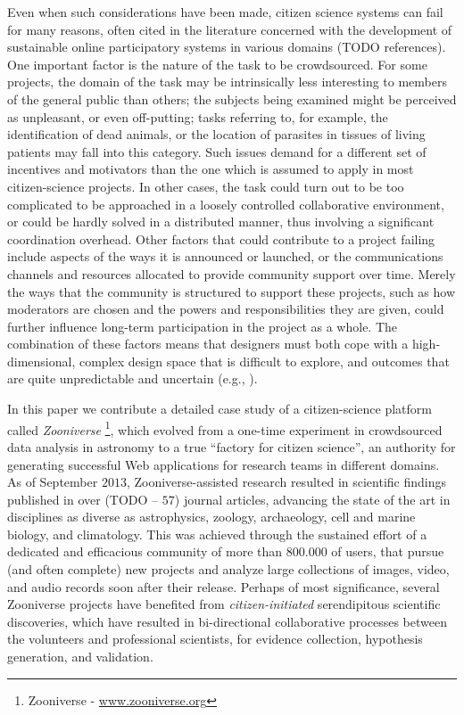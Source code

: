 Even when such considerations have been made, citizen science systems can fail for many reasons, often cited in the literature concerned with the development of sustainable online participatory systems in various domains (TODO references). One important factor is the nature of the task to be crowdsourced. For some projects, the domain of the task may be intrinsically less interesting to members of the general public than others; the subjects being examined might be perceived as unpleasant, or even off-putting; tasks referring to, for example, the identification of dead animals, or the location of parasites in tissues of living patients may fall into this category. Such issues demand for a different set of incentives and motivators than the one which is assumed to apply in most citizen-science projects. In other cases, the task could turn out to be too complicated to be approached in a loosely controlled collaborative environment, or could be hardly solved in a distributed manner, thus involving a significant coordination overhead. Other factors that could contribute to a project failing include aspects of the ways it is announced or launched, or the communications channels and resources allocated to provide community support over time.  Merely the ways that the community is structured to support these projects, such as how moderators are chosen and the powers and responsibilities they are given, could further influence long-term participation in the project as a whole. The combination of these factors means that designers must both cope with a high-dimensional, complex design space that is difficult to explore, and outcomes that are quite unpredictable and uncertain (e.g., \cite{ebird, ubiome, druschke2012failures}).

In this paper we contribute a detailed case study of a citizen-science platform called \emph{Zooniverse} \footnote{Zooniverse - \url{www.zooniverse.org}}, which evolved from a one-time experiment in crowdsourced data analysis in astronomy to a true ``factory for citizen science'', an authority for generating successful Web applications for research teams in different domains. As of September $2013$, Zooniverse-assisted research resulted in scientific findings published in over (TODO -- $57$) journal articles, advancing the state of the art in disciplines as diverse as astrophysics, zoology, archaeology, cell and marine biology, and climatology. This was achieved through the sustained effort of a dedicated and efficacious community of more than $800.000$ of users, that pursue (and often complete) new projects and analyze large collections of images, video, and audio records soon after their release. Perhaps of most significance, several Zooniverse projects have benefited from \emph{citizen-initiated} serendipitous scientific discoveries, which have resulted in bi-directional collaborative processes between the volunteers and professional scientists, for evidence collection, hypothesis generation, and validation.

